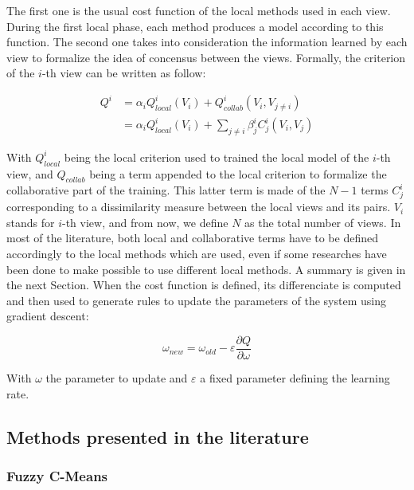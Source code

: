     The first one is the usual cost function of the local methods used in each view. During the first local phase, each method produces a model according to this function. The second one takes into consideration the information learned by each view to formalize the idea of concensus between the views. Formally, the criterion of the $i$-th view can be written as follow:

    \begin{align}
        \label{eq:globalC}
        Q^i &= \alpha_i Q^i_{local}(V_i) + Q^i_{collab}(V_i, V_{j\neq i})\\
        &= \alpha_i Q^i_{local}(V_i) + \sum_{j\neq i} \beta^i_j C_j^i(V_i, V_j)
    \end{align}

    With $Q^i_{local}$ being the local criterion used to trained the local model of the $i$-th view, and $Q_{collab}$ being a term appended to the local criterion to formalize the collaborative part of the training. This latter term is made of the $N-1$ terms $C_j^i$ corresponding to a dissimilarity measure between the local views and its pairs. $V_i$ stands for $i$-th view, and from now, we define $N$ as the total number of views. In most of the literature, both local and collaborative terms have to be defined accordingly to the local methods which are used, even if some researches have been done to make possible to use different local methods. A summary is given in the next Section. When the cost function is defined, its differenciate is computed and then used to generate rules to update the parameters of the system using gradient descent: 
    
    \begin{equation}
        \omega_{new} = \omega_{old} - \varepsilon \frac{\partial Q}{\partial \omega}
        \label{eq:gradient_descent}
    \end{equation}
    
    With $\omega$ the parameter to update and $\varepsilon$ a fixed parameter defining the learning rate. 
    
    \subsection{Methods presented in the literature}

    \subsubsection{Fuzzy C-Means}

